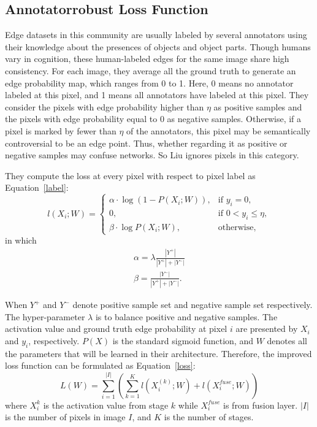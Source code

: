 \documentclass[10pt,twocolumn,letterpaper]{article}
\begin{document}
\subsection{Annotatorrobust Loss Function}

Edge datasets in this community are usually labeled by several annotators using their knowledge about the presences of objects and object parts. Though humans vary in cognition, these human-labeled edges for the same image share high consistency. For each image, they average all the ground truth to generate an edge probability map, which ranges from 0 to 1. Here, 0 means no annotator labeled at this pixel, and 1 means all annotators have labeled at this pixel. They consider the pixels with edge probability higher than $\eta$ as positive samples and the pixels with edge probability equal to 0 as negative samples. Otherwise, if a pixel is marked by fewer than $\eta$ of the annotators, this pixel may be semantically controversial to be an edge point. Thus, whether regarding it as positive or negative samples may confuse networks. So Liu ignores pixels in this category.

They compute the loss at every pixel with respect to pixel label as Equation~\ref{label}:
\begin{equation}
l(X_i;W)=
\begin{cases}
\alpha\cdot\log(1-P(X_i;W)), & \mbox{if } y_i=0, \\
0, & \mbox{if } 0<y_i\leq\eta, \\
\beta\cdot\log P(X_i;W), & \mbox{otherwise},
\end{cases}      \label{label}
\end{equation}
in which 
\begin{align}
\alpha=\lambda \frac{|Y^+|}{|Y^+|+|Y^-|} \label{eq1} \\
\beta=\frac{|Y^-|}{|Y^+|+|Y^-|}. \label{eq2}
\end{align}

When $Y^+$ and $Y^-$ denote positive sample set and negative sample set respectively. The hyper-parameter $\lambda$ is to balance positive and negative samples. The activation value and ground truth edge probability at pixel $i$ are presented by $X_i$ and $y_i$, respectively. $P(X)$ is the standard sigmoid function, and $W$ denotes all the parameters that will be learned in their architecture. Therefore, the improved loss function can be formulated as Equation~\ref{loss}:
\begin{equation}
L(W)=\sum_{i=1}^{|I|}(\sum_{k=1}^{K}l(X_i^{(k)};W)+l(X_i^{fuse};W))  \label{loss}
\end{equation}
where $X_i^{k}$ is the activation value from stage $k$ while $X_i^{fuse}$ is from fusion layer. $|I|$ is the number of pixels in image $I$, and $K$ is the number of stages.
\end{document}
